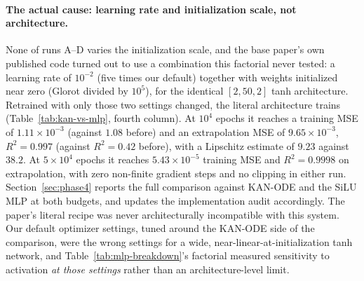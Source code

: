 \paragraph{The actual cause: learning rate and initialization scale, not
architecture.} None of runs A--D varies the initialization scale, and the
base paper's own published code turned out to use a combination this
factorial never tested: a learning rate of $10^{-2}$ (five times our
default) together with weights initialized near zero (Glorot
divided by $10^5$), for the identical $[2,50,2]$ tanh architecture. Retrained
with only those two settings changed, the literal architecture trains
(Table~\ref{tab:kan-vs-mlp}, fourth column). At $10^4$ epochs it reaches a
training MSE of $1.11\times10^{-3}$ (against $1.08$ before) and an
extrapolation MSE of $9.65\times10^{-3}$, $R^2=0.997$ (against $R^2=0.42$
before), with a Lipschitz estimate of $9.23$ against $38.2$. At $5\times10^4$
epochs it reaches $5.43\times10^{-5}$ training MSE
and $R^2=0.9998$ on extrapolation, with zero non-finite gradient steps and no
clipping in either run. Section~\ref{sec:phase4} reports the full comparison
against KAN-ODE and the SiLU MLP at both budgets, and updates the
implementation audit accordingly. The paper's literal recipe was never
architecturally incompatible with this system. Our default
optimizer settings, tuned around the KAN-ODE side of the comparison, were the
wrong settings for a wide, near-linear-at-initialization tanh network, and
Table~\ref{tab:mlp-breakdown}'s factorial measured sensitivity to activation
\emph{at those settings} rather than an architecture-level limit.
